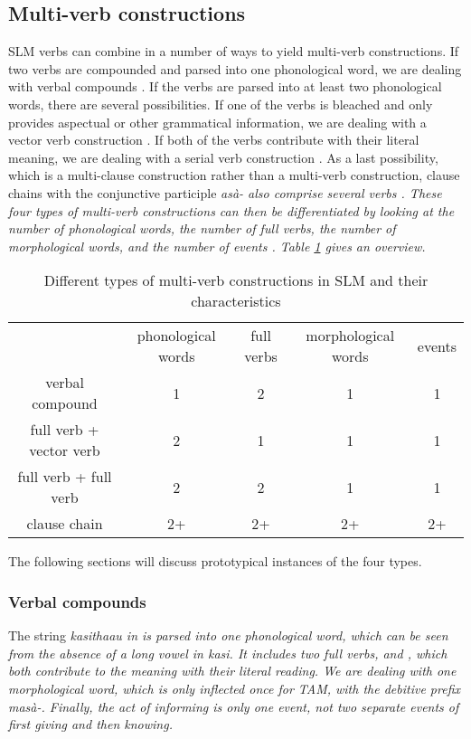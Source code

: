 \subsection{Multi-verb constructions}\label{sec:wc:Multi-verbconstructions}
SLM verbs can combine in a number of ways to yield multi-verb constructions. If two verbs are compounded and parsed into one phonological word, we are dealing with verbal compounds . If the verbs are parsed into at least two phonological words, there are several possibilities. If one of the verbs is bleached and only provides aspectual or other grammatical information, we are dealing with a vector verb construction  . If  both of the verbs contribute with their literal meaning, we are dealing with a serial verb construction . As a last possibility, which is a multi-clause construction rather than a multi-verb construction, clause chains with the conjunctive participle \em asà- \em also comprise several verbs . These four types of multi-verb constructions can then be differentiated by looking at the number of phonological words, the number of full verbs, the number of morphological words, and the number of events \citep{Aikhenvald2006svctp,Dixon2006svccac}. Table \ref{tab:form:mvc} gives an overview.

\begin{table}
\begin{center}
\begin{tabular}{ccccc}
 & phonological words & full verbs & morphological words & events \\
verbal compound & 1 & 2 & 1 & 1 \\
full verb + vector verb & 2 & 1 & 1 & 1 \\
full verb + full verb & 2 & 2 & 1 & 1 \\
clause chain & 2+ & 2+ & 2+ & 2+
\end{tabular}
\end{center}
\caption[Different types of multi-verb constructions]{Different types of multi-verb constructions in SLM and their characteristics}
\label{tab:form:mvc}
\end{table}


The following sections will discuss prototypical instances of the four types.

\subsubsection{Verbal compounds}\label{sec:wc:mvc:Verbalcompounds}
The string \em kasithaau \em in  is parsed into one phonological word, which can be seen from the absence of a long vowel in \em kasi\em. It includes two full verbs,  and , which both contribute to the meaning with their literal reading. We are dealing with one morphological word, which is only inflected once for TAM, with the debitive prefix \em masà-\em. Finally, the act of informing is only one event, not two separate events of first giving and then knowing.

